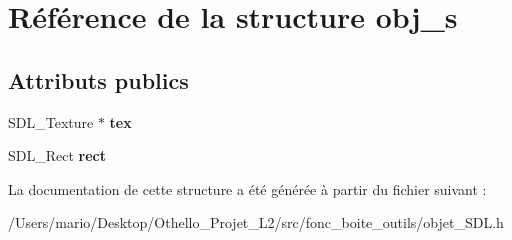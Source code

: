 \hypertarget{structobj__s}{}\section{Référence de la structure obj\+\_\+s}
\label{structobj__s}
\subsection*{Attributs publics}
\begin{DoxyCompactItemize}
\item 
\mbox{\label{structobj__s_a6820206cd7a4bf4b651ca25096c283ed}} 
S\+D\+L\+\_\+\+Texture $\ast$ {\bfseries tex}
\item 
\mbox{\label{structobj__s_a69ea805de1110d57225f9fca699b3899}} 
S\+D\+L\+\_\+\+Rect {\bfseries rect}
\end{DoxyCompactItemize}


La documentation de cette structure a été générée à partir du fichier suivant \+:\begin{DoxyCompactItemize}
\item 
/\+Users/mario/\+Desktop/\+Othello\+\_\+\+Projet\+\_\+\+L2/src/fonc\+\_\+boite\+\_\+outils/objet\+\_\+\+S\+D\+L.\+h\end{DoxyCompactItemize}
